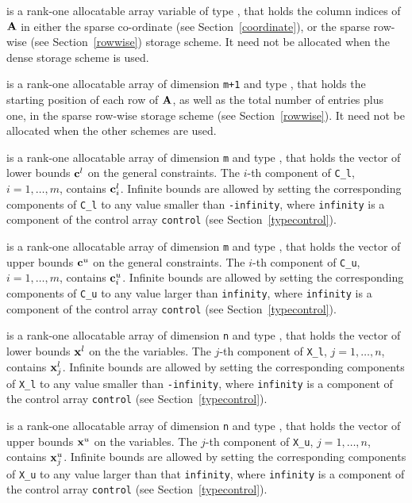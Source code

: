 \documentclass{galahad}
\begin{document}
\begin{description}
\begin{description}
 is a rank-one allocatable array variable of type \integer,
that holds the column indices of ${\mathbf{A}}$ in either the sparse co-ordinate 
(see Section~\ref{coordinate}), or the sparse row-wise 
(see Section~\ref{rowwise}) storage scheme.
It need not be allocated when the dense storage scheme is used.

 is a rank-one allocatable array of dimension {\tt m+1} and type 
\integer, that holds the 
starting position of each row of ${\mathbf{A}}$, as well
as the total number of entries plus one, in the sparse row-wise storage
scheme (see Section~\ref{rowwise}). It need not be allocated when the
other schemes are used.

\end{description}

 is a rank-one allocatable array of dimension {\tt m} and type 
\realdp, that holds the vector of lower bounds ${\mathbf{c}}^{l}$ 
on the general constraints. The $i$-th component of 
{\tt C\_l}, $i = 1, \ldots , m$, contains ${\mathbf{c}}_{i}^{l}$.
Infinite bounds are allowed by setting the corresponding 
components of {\tt C\_l} to any value smaller than {\tt -infinity}, 
where {\tt infinity} is a component of the control array {\tt control} 
(see Section~\ref{typecontrol}).

 is a rank-one allocatable array of dimension {\tt m} and type 
\realdp, that holds the vector of upper bounds ${\mathbf{c}}^{u}$ 
on the general constraints. The $i$-th component of 
{\tt C\_u}, $i = 1,  \ldots ,  m$, contains ${\mathbf{c}}_{i}^{u}$.
Infinite bounds are allowed by setting the corresponding 
components of {\tt C\_u} to any value larger than {\tt infinity}, 
where {\tt infinity} is a component of the control array {\tt control} 
(see Section~\ref{typecontrol}).

 is a rank-one allocatable array of dimension {\tt n} and type 
\realdp, that holds
the vector of lower bounds ${\mathbf{x}}^{l}$ on the the variables.
The $j$-th component of {\tt X\_l}, $j = 1, \ldots , n$, 
contains ${\mathbf{x}}_{j}^{l}$.
Infinite bounds are allowed by setting the corresponding 
components of {\tt X\_l} to any value smaller than {\tt -infinity}, 
where {\tt infinity} is a component of the control array {\tt control} 
(see Section~\ref{typecontrol}).

 is a rank-one allocatable array of dimension {\tt n} and type 
\realdp, that holds
the vector of upper bounds ${\mathbf{x}}^{u}$ on the variables.
The $j$-th component of {\tt X\_u}, $j = 1, \ldots , n$, 
contains ${\mathbf{x}}_{j}^{u}$.
Infinite bounds are allowed by setting the corresponding 
components of {\tt X\_u} to any value larger than that {\tt infinity}, 
where {\tt infinity} is a component of the control array {\tt control} 
(see Section~\ref{typecontrol}).


\end{description}
\end{document}
